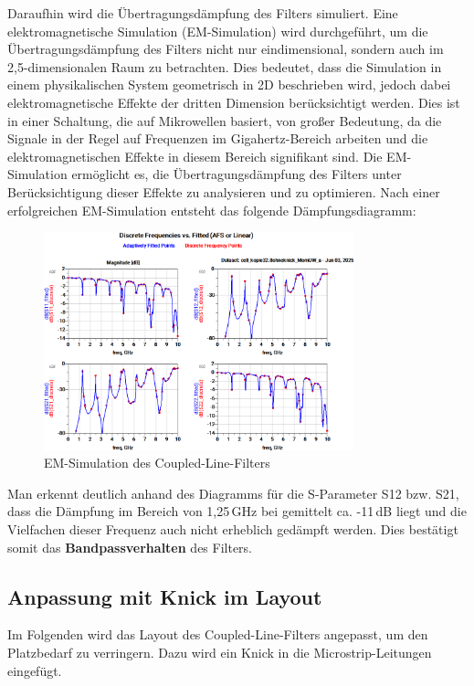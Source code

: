 Daraufhin wird die Übertragungsdämpfung des Filters simuliert. Eine elektromagnetische Simulation (EM-Simulation) wird durchgeführt, um die Übertragungsdämpfung des Filters nicht nur eindimensional, sondern auch im 2,5-dimensionalen Raum zu betrachten. 
Dies bedeutet, dass die Simulation in einem physikalischen System geometrisch in 2D beschrieben wird, jedoch dabei elektromagnetische Effekte der dritten Dimension berücksichtigt werden. 
Dies ist in einer Schaltung, die auf Mikrowellen basiert, von großer Bedeutung, da die Signale in der Regel auf Frequenzen im Gigahertz-Bereich arbeiten und die elektromagnetischen Effekte in diesem Bereich signifikant sind. 
Die EM-Simulation ermöglicht es, die Übertragungsdämpfung des Filters unter Berücksichtigung dieser Effekte zu analysieren und zu optimieren.
Nach einer erfolgreichen EM-Simulation entsteht das folgende Dämpfungsdiagramm:
\begin{figure}[H]
    \centering
    \includegraphics[width=0.8\textwidth]{Pictures/EMSimulationohneKnick.png}
    \caption{EM-Simulation des Coupled-Line-Filters}
\end{figure}

Man erkennt deutlich anhand des Diagramms für die S-Parameter S12 bzw. S21, dass die Dämpfung im Bereich von 1,25\,GHz bei gemittelt ca. -11\,dB liegt und die Vielfachen dieser Frequenz auch nicht erheblich gedämpft werden. Dies bestätigt somit das \textbf{Bandpassverhalten} des Filters.
\subsection{Anpassung mit Knick im Layout}
Im Folgenden wird das Layout des Coupled-Line-Filters angepasst, um den Platzbedarf zu verringern. Dazu wird ein Knick in die Microstrip-Leitungen eingefügt.
